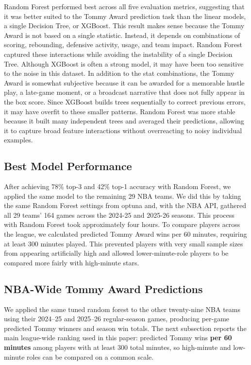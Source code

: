 \documentclass[11pt]{article}
\begin{document}
Random Forest performed best across all five evaluation metrics, suggesting that it was better suited to the Tommy Award prediction task than the linear models, a single Decision Tree, or XGBoost. This result makes sense because the Tommy Award is not based on a single statistic. Instead, it depends on combinations of scoring, rebounding, defensive activity, usage, and team impact. Random Forest captured these interactions while avoiding the instability of a single Decision Tree. Although XGBoost is often a strong model, it may have been too sensitive to the noise in this dataset. In addition to the stat combinations, the Tommy Award is somewhat subjective because it can be awarded for a memorable hustle play, a late-game moment, or a broadcast narrative that does not fully appear in the box score. Since XGBoost builds trees sequentially to correct previous errors, it may have overfit to these smaller patterns. Random Forest was more stable because it built many independent trees and averaged their predictions, allowing it to capture broad feature interactions without overreacting to noisy individual examples.

\subsection{Best Model Performance}
After achieving 78\% top-3 and 42\% top-1 accuracy with Random Forest, we applied the same model to the remaining 29 NBA teams. We did this by taking the same Random Forest settings from optuna and, with the NBA API, gathered all 29 teams' 164 games across the 2024-25 and 2025-26 seasons. This process with Random Forest took approximately four hours. To compare players across the league, we calculated predicted Tommy Award wins per 60 minutes, requiring at least 300 minutes played. This prevented players with very small sample sizes from appearing artificially high and allowed lower-minute-role players to be compared more fairly with high-minute stars.

\subsection{NBA-Wide Tommy Award Predictions}
We applied the same tuned random forest to the other twenty-nine NBA teams using their 2024--25 and 2025--26 regular-season games, producing per-game predicted Tommy winners and season win totals. The next subsection reports the main league-wide ranking used in this paper: predicted Tommy wins \textbf{per 60 minutes} among players with at least 300 total minutes, so high-minute and low-minute roles can be compared on a common scale.
\end{document}
